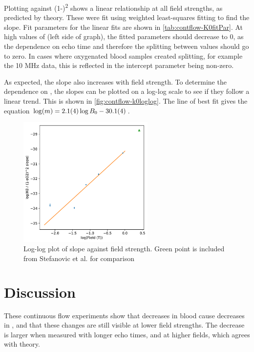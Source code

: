 Plotting \Kzero against (1-\SOtwo)\textsuperscript{2} shows a linear relationship at all field strengths, as predicted by theory.
These were fit using weighted least-squares fitting to find the slope.
Fit parameters for the linear fits are shown in \autoref{tab:contflow-K0fitPar}.
At high values of \SOtwo (left side of graph), the fitted \Kzero parameters should decrease to 0, as the dependence on echo time and therefore the splitting between \Ttwo values should go to zero.
In cases where oxygenated blood samples created splitting, for example the 10 MHz data, this is reflected in the intercept parameter being non-zero.

As expected, the slope also increases with field strength.
To determine the dependence on \Bzero, the slopes can be plotted on a log-log scale to see if they follow a linear trend.
This is shown in \autoref{fig:contflow-k0loglog}.
The line of best fit gives the equation $\log(m) = \num{2.1\pm0.4} \log{B_0} - \num{30.1\pm0.4}$.

\begin{figure}[tbh]
\centering
\includegraphics[width=0.6\textwidth]{figures/contflow/k0slopefield.pdf}
\caption[\Kzero slope dependence on \Bzero]{Log-log plot of \Kzero slope against field strength. Green point is included from Stefanovic et al. for comparison \cite{StefanovicHumanwholebloodrelaxometry2004}}
\label{fig:contflow-k0loglog}
\end{figure}

\section{Discussion}
These continuous flow experiments show that decreases in blood \SOtwo cause decreases in \Ttwo, and that these changes are still visible at lower field strengths.
The \Ttwo decrease is larger when measured with longer echo times, and at higher fields, which agrees with theory.

